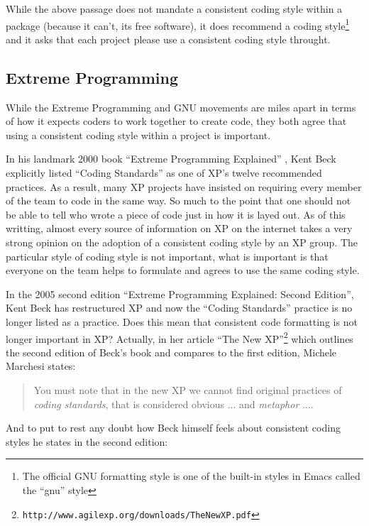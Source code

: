 While the above passage does not mandate a consistent coding style within a
package (because it can't, its free software), it does recommend a coding
style\footnote{The official GNU formatting style is one of the built-in styles
in Emacs called the ``gnu'' style} and it asks that each project please use a
consistent coding style throught.

%
\subsection{Extreme Programming}
%

While the Extreme Programming and GNU movements are miles apart in terms of
how it expects coders to work together to create code, they both agree that
using a consistent coding style within a project is important.

In his landmark 2000 book ``Extreme Programming Explained''
{}\cite{ExtremeProgrammingExplained}, Kent Beck explicitly listed ``Coding
Standards'' as one of XP's twelve recommended practices.  As a result, many XP
projects have insisted on requiring every member of the team to code in the
same way.  So much to the point that one should not be able to tell who wrote
a piece of code just in how it is layed out.  As of this writting, almost
every source of information on XP on the internet takes a very strong opinion
on the adoption of a consistent coding style by an XP group.  The particular
style of coding style is not important, what is important is that everyone on
the team helps to formulate and agrees to use the same coding style.

In the 2005 second edition ``Extreme Programming Explained: Second Edition'',
Kent Beck has restructured XP and now the ``Coding Standards'' practice is no
longer listed as a practice.  Does this mean that consistent code formatting
is not longer important in XP?  Actually, in her article ``The New
XP''\footnote{{}\texttt{http://www.agilexp.org/downloads/TheNewXP.pdf}} which
outlines the second edition of Beck's book and compares to the first edition,
Michele Marchesi states:

\begin{quote}

You must note that in the new XP we cannot find original practices of
{}\textit{coding standards}, that is considered obvious ... and
{}\textit{metaphor} ....

\end{quote}

And to put to rest any doubt how Beck himself feels about consistent coding
styles he states in the second edition:

